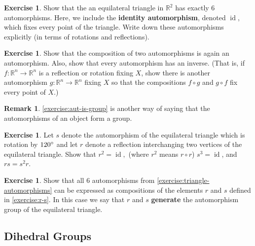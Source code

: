 \documentclass[reqno, 12pt, letter]{article}
\theoremstyle{plain}
\theoremstyle{definition}
\newtheorem{remark}[theorem]{Remark}
\newtheorem{exercise}[theorem]{Exercise}
\theoremstyle{remark}
\numberwithin{equation}{section}
\newcommand\br{{\mathbb R}}
\newcommand \ra{\rightarrow}
\DeclareMathOperator\id{id}
\begin{document}
\begin{exercise}
	\label{exercise:triangle-automorphisms}
	Show that the an equilateral triangle in $\br^2$ has exactly $6$ automorphisms.
	Here, we include the {\bf identity automorphism}, denoted $\id$, which fixes every point of the triangle.
	Write down these automorphisms explicitly (in terms of rotations and reflections).
\end{exercise}
\begin{exercise}
	\label{exercise:aut-is-group}
	Show that the composition of two automorphisms is again an automorphism.
	Also, show that every automorphism has an inverse. (That is, if $f: \br^n \ra \br^n$ is a reflection or rotation fixing $X$, show there is
	another automorphism $g: \br^n \ra \br^n$ fixing $X$ so that the compositions $f \circ g$ and $g \circ f$ fix every point of $X$.)
\end{exercise}
\begin{remark}
	\label{remark:}
	\autoref{exercise:aut-is-group} is another way of saying that the automorphisms of an object form a group.
\end{remark}
\begin{exercise}
	\label{exercise:r-s}
	Let $s$ denote the automorphism of the equilateral triangle which is rotation by $120\degree$
	and let $r$ denote a reflection interchanging two vertices of the equilateral triangle.
	Show that $r^2= \id,$ (where $r^2$ means $r \circ r$) $s^3 = \id$, and $rs = s^2r$.
\end{exercise}
\begin{exercise}
	\label{exercise:}
	Show that all $6$ automorphisms from \autoref{exercise:triangle-automorphisms} can be expressed as compositions
	of the elements $r$ and $s$ defined in \autoref{exercise:r-s}. In this case we say that $r$ and $s$ {\bf generate}
	the automorphism group of the equilateral triangle.
\end{exercise}

\subsection{Dihedral Groups}
\end{document}

